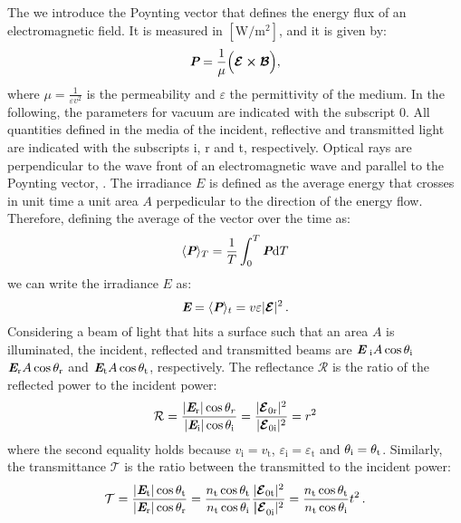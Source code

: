 \indent The  we introduce the Poynting vector  that defines the energy flux of an electromagnetic field. 
It is measured in $[\textrm{W}/\textrm{m}^2]$, and it is given by:
\begin{equation}
\textit{\textbf{P}} = \frac{1}{\mu}\Big(\boldsymbol{\mathcal{E}}\boldsymbol{\times} \boldsymbol{\mathcal{B}}\Big),
\end{equation}
where $\mu = \frac{1}{\varepsilon v^2}$ is the permeability and $\varepsilon$ the permittivity of the medium.
 In the following, the parameters for vacuum are indicated with the subscript $0$. All quantities defined in the media of the incident, reflective and transmitted light are indicated with the subscripts \textrm{i}, \textrm{r} and \textrm{t}, respectively. Optical rays are perpendicular to the wave front of an electromagnetic wave and parallel to the Poynting vector, \cite{jones2015optical}.
The irradiance $E$ is defined as the average energy that crosses in unit time a unit area $A$ perpedicular to the direction of the energy flow.
Therefore, defining the average of the vector  over the time as:
\begin{equation}
\langle \textit{\textbf{P}} \rangle_T = \frac{1}{T}\int_0^T \textit{\textbf{P}}\textrm{d}T
\end{equation}
we can write the irradiance $E$ as:
\begin{equation}
\textit{\textbf{E}} = \langle\textit{\textbf{P}}\rangle_{t} = v\varepsilon|\boldsymbol{\mathcal{E}}|^2 \,.
\end{equation}
Considering a beam of light that hits a surface such that an area $A$ is illuminated, the incident, reflected and transmitted beams are 
$\textit{\textbf{E}}_\textrm{
i} A\cos\theta_\textrm{i}$ $\textit{\textbf{E}}_\textrm{r} A\cos\theta_\textrm{r}$ and 
$\textit{\textbf{E}}_\textrm{t} A\cos\theta_\textrm{t}$, respectively. %
The reflectance $\mathcal{R}$ is the ratio of the reflected power to the incident power:
\begin{equation}\label{reflectance}
\mathcal{R} = \frac{|\textit{\textbf{E}}_\textrm{r}|\cos\theta_r}{|\textit{\textbf{E}}_\textrm{i}|\cos\theta_\textrm{i}} = \frac{|\boldsymbol{\mathcal{E}}_{0 \textrm{r}}|^2}{|\boldsymbol{\mathcal{E}}_{0 \textrm{i}}|^2} = r^2
\end{equation}
where the second equality holds because $v_{\textrm{i}}= v_{\textrm{t}}$, $\varepsilon_{\textrm{i}} = \varepsilon_{\textrm{t}}$ and $\theta_{\textrm{i}} = \theta_{\textrm{t}}$.
Similarly, the transmittance $\mathcal{T}$ is the ratio between the transmitted to the incident power:
\begin{equation}\label{transmittance}
\mathcal{T} = \frac{|\textit{\textbf{E}}_\textrm{t}| \cos\theta_\textrm{t}}{|\textit{\textbf{E}}_\textrm{r}|\cos\theta_\textrm{r}} = \frac{n_\textrm{t} \cos\theta_\textrm{t}}{n_\textrm{t} \cos\theta_\textrm{i}}\frac{|\boldsymbol{\mathcal{E}}_{0 \textrm{t}}|^2}{\boldsymbol{|\mathcal{E}}_{0 \textrm{i}}|^2} = \frac{n_\textrm{t} \cos\theta_\textrm{t}}{n_\textrm{t} \cos\theta_\textrm{i}} t^2\,.
\end{equation}
